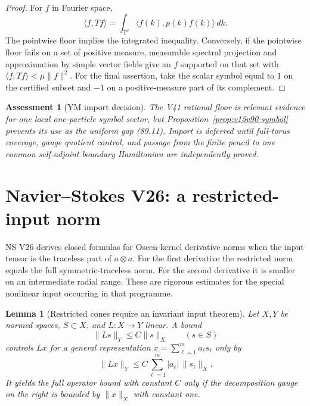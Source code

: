 \documentclass[11pt]{article}
\newtheorem{lemma}[theorem]{Lemma}
\newtheorem{assessment}[theorem]{Assessment}
\theoremstyle{remark}
\begin{document}
\begin{proof}
For \(f\) in Fourier space,
\[
 \langle f,Tf\rangle
 =\int_{\mathbb T^d}\langle f(k),p(k)f(k)\rangle\,dk.   \tag{90.4}
\]
The pointwise floor implies the integrated inequality.  Conversely,
if the pointwise floor fails on a set of positive measure, measurable
spectral projection and approximation by simple vector fields give
an \(f\) supported on that set with
\(\langle f,Tf\rangle<\mu\|f\|^2\).  For the final assertion, take
the scalar symbol equal to \(1\) on the certified subset and
\(-1\) on a positive-measure part of its complement.
\end{proof}

\begin{assessment}[YM import decision]
\label{ass:v15v90-ym}
The V41 rational floor is relevant evidence for one local
one-particle symbol sector, but Proposition~\ref{prop:v15v90-symbol}
prevents its use as the uniform gap (89.11).  Import is deferred
until full-torus coverage, gauge quotient control, and passage from
the finite pencil to one common self-adjoint boundary Hamiltonian
are independently proved.
\end{assessment}

\section{Navier--Stokes V26: a restricted-input norm}

NS V26 derives closed formulas for Oseen-kernel derivative norms
when the input tensor is the traceless part of \(a\otimes a\).
For the first derivative the restricted norm equals the full
symmetric-traceless norm.  For the second derivative it is smaller
on an intermediate radial range.  These are rigorous estimates for
the special nonlinear input occurring in that programme.

\begin{lemma}[Restricted cones require an invariant input theorem]
\label{lem:v15v90-cone}
Let \(X,Y\) be normed spaces, \(S\subset X\), and \(L:X\to Y\)
linear.  A bound
\[
 \|Ls\|_Y\leq C\|s\|_X\qquad(s\in S)                  \tag{90.5}
\]
controls \(Lx\) for a general representation
\(x=\sum_{\ell=1}^m a_\ell s_\ell\) only by
\[
 \|Lx\|_Y
 \leq C\sum_{\ell=1}^m|a_\ell|\,\|s_\ell\|_X.         \tag{90.6}
\]
It yields the full operator bound with constant \(C\) only if the
decomposition gauge on the right is bounded by \(\|x\|_X\) with
constant one.
\end{lemma}
\end{document}
